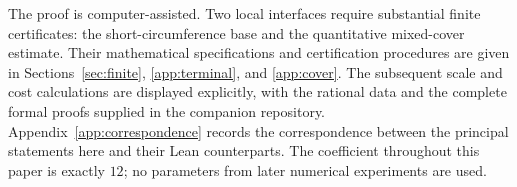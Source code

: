 The proof is computer-assisted. Two local interfaces require substantial
finite certificates: the short-circumference base and the quantitative
mixed-cover estimate. Their mathematical specifications and certification
procedures are given in Sections~\ref{sec:finite}, \ref{app:terminal}, and
\ref{app:cover}. The subsequent scale and cost calculations are displayed
explicitly, with the rational data and the complete formal proofs supplied
in the companion repository. Appendix~\ref{app:correspondence} records the
correspondence between the principal statements here and their Lean
counterparts. The coefficient throughout this paper is exactly $12$; no
parameters from later numerical experiments are used.
